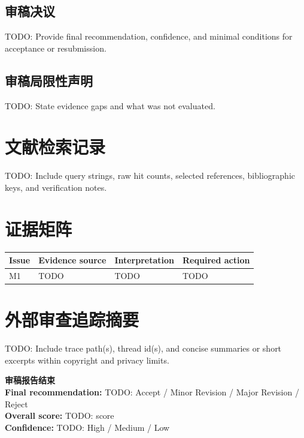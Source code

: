 \documentclass[11pt,a4paper]{article}
\newcommand{\Recommendation}{TODO: Accept / Minor Revision / Major Revision / Reject}
\newcommand{\OverallScore}{TODO: score}
\newcommand{\ReviewConfidence}{TODO: High / Medium / Low}
\begin{document}
\subsection{审稿决议}
TODO: Provide final recommendation, confidence, and minimal conditions for acceptance or resubmission.

\subsection{审稿局限性声明}
TODO: State evidence gaps and what was not evaluated.

\appendix

\section{文献检索记录}

TODO: Include query strings, raw hit counts, selected references, bibliographic keys, and verification notes.

\section{证据矩阵}

\begin{longtable}{p{}p{}p{}p{}}
\toprule
\textbf{Issue} & \textbf{Evidence source} & \textbf{Interpretation} & \textbf{Required action} \\
\midrule
M1 & TODO & TODO & TODO \\
\bottomrule
\end{longtable}

\section{外部审查追踪摘要}

TODO: Include trace path(s), thread id(s), and concise summaries or short excerpts within copyright and privacy limits.

\vspace{2em}
\begin{center}
\begin{tcolorbox}[colback=gray!8,colframe=gray!55!black,width=0.82\textwidth,arc=2mm]
\centering
\Large\textbf{审稿报告结束}\\[0.5em]
\normalsize
\textbf{Final recommendation:} \Recommendation\\
\textbf{Overall score:} \OverallScore\\
\textbf{Confidence:} \ReviewConfidence
\end{tcolorbox}
\end{center}
\end{document}
